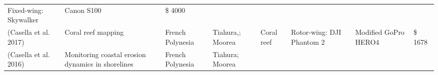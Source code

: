 \documentclass[]{interact}
\theoremstyle{plain}%
\theoremstyle{definition}
\theoremstyle{remark}
\begin{document}
\begin{longtable}[]{@{}llllllll@{}}
\begin{minipage}[t]{0.09\columnwidth}
Fixed-wing: Skywalker\strut
\end{minipage} & \begin{minipage}[t]{0.11\columnwidth}\raggedright\strut
Canon S100\strut
\end{minipage} & \begin{minipage}[t]{0.01\columnwidth}\raggedright\strut
\$ 4000\strut
\end{minipage}\tabularnewline
\begin{minipage}[t]{0.11\columnwidth}\raggedright\strut
(Casella et al. 2017)\strut
\end{minipage} & \begin{minipage}[t]{0.18\columnwidth}\raggedright\strut
Coral reef mapping\strut
\end{minipage} & \begin{minipage}[t]{0.03\columnwidth}\raggedright\strut
French Polynesia\strut
\end{minipage} & \begin{minipage}[t]{0.14\columnwidth}\raggedright\strut
Tiahura,; Moorea\strut
\end{minipage} & \begin{minipage}[t]{0.10\columnwidth}\raggedright\strut
Coral reef\strut
\end{minipage} & \begin{minipage}[t]{0.09\columnwidth}\raggedright\strut
Rotor-wing: DJI Phantom 2\strut
\end{minipage} & \begin{minipage}[t]{0.11\columnwidth}\raggedright\strut
Modified GoPro HERO4\strut
\end{minipage} & \begin{minipage}[t]{0.01\columnwidth}\raggedright\strut
\$ 1678\strut
\end{minipage}\tabularnewline
\begin{minipage}[t]{0.11\columnwidth}\raggedright\strut
(Casella et al. 2016)\strut
\end{minipage} & \begin{minipage}[t]{0.18\columnwidth}\raggedright\strut
Monitoring coastal erosion dynamics in shorelines\strut
\end{minipage} & \begin{minipage}[t]{0.03\columnwidth}\raggedright\strut
French Polynesia\strut
\end{minipage} & \begin{minipage}[t]{0.14\columnwidth}\raggedright\strut
Tiahura; Moorea\strut
\end{minipage} & \begin{minipage}[t]{0.10\columnwidth}\raggedright\strut

\end{minipage}
\end{longtable}
\end{document}
